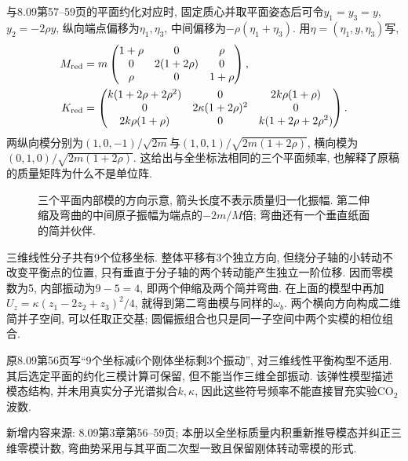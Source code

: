 \begin{solution}
与8.09第57--59页的平面约化对应时, 固定质心并取平面姿态后可令$y_1=y_3=y$, $y_2=-2\rho y$, 纵向端点偏移为$\eta_1,\eta_3$, 中间偏移为$-\rho(\eta_1+\eta_3)$. 用$\eta=(\eta_1,y,\eta_3)$写,
\begin{align*}
M_{\rm red}&=m\begin{pmatrix}1+\rho&0&\rho\\0&2(1+2\rho)&0\\\rho&0&1+\rho\end{pmatrix},\\
K_{\rm red}&=\begin{pmatrix}k(1+2\rho+2\rho^2)&0&2k\rho(1+\rho)\\0&2\kappa(1+2\rho)^2&0\\2k\rho(1+\rho)&0&k(1+2\rho+2\rho^2)\end{pmatrix}.
\end{align*}
两纵向模分别为$(1,0,-1)/\sqrt{2m}$与$(1,0,1)/\sqrt{2m(1+2\rho)}$, 横向模为$(0,1,0)/\sqrt{2m(1+2\rho)}$. 这给出与全坐标法相同的三个平面频率, 也解释了原稿的质量矩阵为什么不是单位阵.
\end{solution}

\begin{figure}[htbp]
\centering
{}
\caption{三个平面内部模的方向示意, 箭头长度不表示质量归一化振幅. 第二伸缩及弯曲的中间原子振幅为端点的$-2m/M$倍; 弯曲还有一个垂直纸面的简并伙伴.}
\end{figure}

三维线性分子共有9个位移坐标. 整体平移有3个独立方向, 但绕分子轴的小转动不改变平衡点的位置, 只有垂直于分子轴的两个转动能产生独立一阶位移. 因而零模数为5, 内部振动为$9-5=4$, 即两个伸缩及两个简并弯曲. 在上面的模型中再加$U_z=\kappa(z_1-2z_2+z_3)^2/4$, 就得到第二弯曲模与同样的$\omega_b$. 两个横向方向构成二维简并子空间, 可以任取正交基; 圆偏振组合也只是同一子空间中两个实模的相位组合.

原8.09第56页写“9个坐标减6个刚体坐标剩3个振动”, 对三维线性平衡构型不适用. 其后选定平面的约化三模计算可保留, 但不能当作三维全部振动. 该弹性模型描述模态结构, 并未用真实分子光谱拟合$k,\kappa$, 因此这些符号频率不能直接冒充实验CO$_2$波数.

新增内容来源: 8.09第3章第56--59页; 本册以全坐标质量内积重新推导模态并纠正三维零模计数, 弯曲势采用与其平面二次型一致且保留刚体转动零模的形式.
